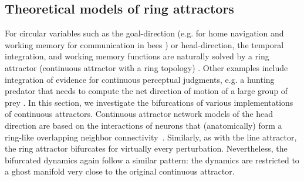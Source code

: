 \documentclass{article} %
\newcounter{ct}
\theoremstyle{definition}
\theoremstyle{remark}
\begin{document}
\subsection{Theoretical models of ring attractors}\label{sec:ras}

For circular variables such as the goal-direction (e.g. for home navigation and working memory for communication	 in bees \citep{frisch1993dance}) %
or head-direction, the temporal integration, and working memory functions are naturally solved by a ring attractor (continuous attractor with a ring topology) \citep{kim2019generation, turner2017angular, turner2020neuroanatomical,hulse2020mechanisms,taube2007head}.
Other examples include
integration of evidence for continuous perceptual judgments, e.g. a hunting predator that needs to compute the net direction of motion of a large group of prey \citep{esnaola2022flexible}.
In this section, we investigate the bifurcations of various implementations of continuous attractors.
Continuous attractor network models of the head direction are based on the interactions of neurons that (anatomically) form a ring-like overlapping neighbor connectivity~\citep{zhang1996,Noorman2022,ajabi2023,vafidis2022,boucheny2005continuous,knierim2012}.
Similarly, as with the line attractor, the ring attractor bifurcates for virtually every perturbation.
Nevertheless, the bifurcated dynamics again follow a similar pattern: the dynamics are restricted to a ghost manifold very close to the original continuous attractor.
\end{document}
